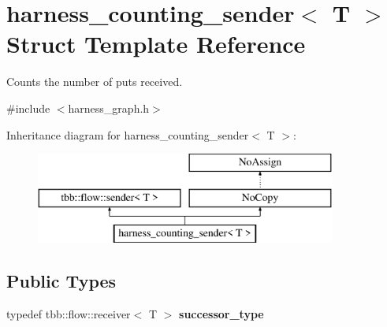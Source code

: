 \hypertarget{structharness__counting__sender}{}\section{harness\+\_\+counting\+\_\+sender$<$ T $>$ Struct Template Reference}
\label{structharness__counting__sender}


Counts the number of puts received.  




{\ttfamily \#include $<$harness\+\_\+graph.\+h$>$}

Inheritance diagram for harness\+\_\+counting\+\_\+sender$<$ T $>$\+:\begin{figure}[H]
\begin{center}
\leavevmode
\includegraphics[height=3.000000cm]{structharness__counting__sender}
\end{center}
\end{figure}
\subsection*{Public Types}
\begin{DoxyCompactItemize}
\item 
\hypertarget{structharness__counting__sender_a851985838084349c06aed2cf883e3f8b}{}typedef tbb\+::flow\+::receiver$<$ T $>$ {\bfseries successor\+\_\+type}\label{structharness__counting__sender_a851985838084349c06aed2cf883e3f8b}

\end{DoxyCompactItemize}
